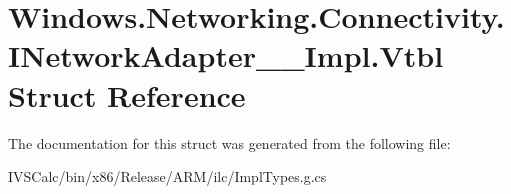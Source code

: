 \hypertarget{struct_windows_1_1_networking_1_1_connectivity_1_1_i_network_adapter_____impl_1_1_vtbl}{}\section{Windows.\+Networking.\+Connectivity.\+I\+Network\+Adapter\+\_\+\+\_\+\+Impl.\+Vtbl Struct Reference}
\label{struct_windows_1_1_networking_1_1_connectivity_1_1_i_network_adapter_____impl_1_1_vtbl}


The documentation for this struct was generated from the following file\+:\begin{DoxyCompactItemize}
\item 
I\+V\+S\+Calc/bin/x86/\+Release/\+A\+R\+M/ilc/Impl\+Types.\+g.\+cs\end{DoxyCompactItemize}
